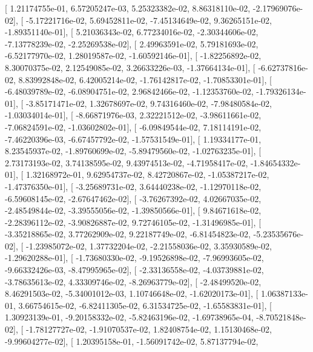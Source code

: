 \documentclass{article}
\begin{document}
       [  1.21174755e-01,   6.57205247e-03,   5.25323382e-02,
          8.86318110e-02,  -2.17969076e-02],
       [ -5.17221716e-02,   5.69452811e-02,  -7.45134649e-02,
          9.36265151e-02,  -1.89351140e-01],
       [  5.21036343e-02,   6.77234016e-02,  -2.30344606e-02,
         -7.13778239e-02,  -2.25269538e-02],
       [  2.49963591e-02,   5.79181693e-02,  -6.52177970e-02,
          1.28019587e-02,  -1.60592146e-01],
       [ -1.82256892e-02,   8.30070375e-02,   2.12549085e-02,
          3.26633226e-03,  -1.37664134e-01],
       [ -6.62737816e-02,   8.83992848e-02,   6.42005214e-02,
         -1.76142817e-02,  -1.70853301e-01],
       [ -6.48039789e-02,  -6.08904751e-02,   2.96842466e-02,
         -1.12353760e-02,  -1.79326134e-01],
       [ -3.85171471e-02,   1.32678697e-02,   9.74316460e-02,
         -7.98480584e-02,  -1.03034014e-01],
       [ -8.66871976e-03,   2.32221512e-02,  -3.98611661e-02,
         -7.06824591e-02,  -1.03602802e-01],
       [ -6.09849544e-02,   7.18114191e-02,  -7.46220396e-03,
         -6.67457792e-02,  -1.57531549e-01],
       [  1.19334177e-01,   8.23545937e-02,  -1.89760699e-02,
         -5.89479560e-02,  -1.02763235e-01],
       [  2.73173193e-02,   3.74138595e-02,   9.43974513e-02,
         -4.71958417e-02,  -1.84654332e-01],
       [  1.32168972e-01,   9.62954737e-02,   8.42720867e-02,
         -1.05387217e-02,  -1.47376350e-01],
       [ -3.25689731e-02,   3.64440238e-02,  -1.12970118e-02,
         -6.59608145e-02,  -2.67647462e-02],
       [ -3.76267392e-02,   4.02667035e-02,  -2.48549844e-02,
         -3.39555056e-02,  -1.39850566e-01],
       [  9.84671618e-02,  -2.28396112e-02,  -3.90826887e-02,
          9.72746105e-02,  -1.31496985e-01],
       [ -3.35218865e-02,   3.77262909e-02,   9.22187749e-02,
         -6.81454823e-02,  -5.23535676e-02],
       [ -1.23985072e-02,   1.37732204e-02,  -2.21558036e-02,
          3.35930589e-02,  -1.29620288e-01],
       [ -1.73680330e-02,  -9.19526898e-02,  -7.96993605e-02,
         -9.66332426e-03,  -8.47995965e-02],
       [ -2.33136558e-02,  -4.03739881e-02,  -3.78635613e-02,
          4.33309746e-02,  -8.26963779e-02],
       [ -2.48499520e-02,   8.46291503e-02,  -5.34001012e-03,
          1.10746648e-02,  -1.62020173e-01],
       [  1.06387133e-01,   3.66754615e-02,  -6.82411305e-02,
          6.31534725e-02,  -1.65583831e-01],
       [  1.30923139e-01,  -9.20158332e-02,  -5.82463196e-02,
         -1.69738965e-04,  -8.70521848e-02],
       [ -1.78127727e-02,  -1.91070537e-02,   1.82408754e-02,
          1.15130468e-02,  -9.99604277e-02],
       [  1.20395158e-01,  -1.56091742e-02,   5.87137794e-02,
\end{document}
